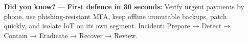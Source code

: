 \begin{tcolorbox}[
  colback=SoftYellow,
  colframe=IEEEblue!70!black,
  boxrule=0.5pt,
  arc=0mm,
  left=3mm, right=3mm, top=2mm, bottom=2mm
]
\small\RaggedRight \textbf{\color{IEEEblue!75!black}Did you know?} — \textbf{First defence in 30 seconds:} Verify urgent payments by phone, use phishing-resistant MFA, keep offline immutable backups, patch quickly, and isolate IoT on its own segment. Incident: Prepare → Detect → Contain → Eradicate → Recover → Review.
\end{tcolorbox}
